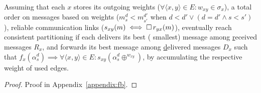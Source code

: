\begin{theorem}
    Assuming that each \process $x$ stores its outgoing weights
    ($\forall \langle x, y \rangle \in E: w_{xy} \in \sigma_x$), a
    total order on messages based on weights ($m^d_s < m^{d'}_{s'}$
    when $d < d' \vee (d = d' \wedge s< s')$), reliable communication
    links ($s_{xy}(m) \iff \square\, r_{yx}(m)$), \processes eventually reach
    consistent partitioning if each \process delivers its best (\ie
    smallest) message among \underline{r}eceived messages $R_x$, and
    forwards its best message among \underline{d}elivered messages
    $D_x$ such that $f_x(\alpha^d_s) \implies \forall \langle x, y
    \rangle \in E: s_{xy}(\alpha_s^d \oplus ^{w_{xy}})$, \ie by
    accumulating the respective weight of used edges.
\end{theorem}

\begin{proof}
  Proof in Appendix~\ref{appendix:fb}.
\end{proof}


